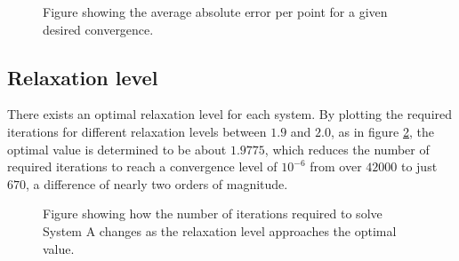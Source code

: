 \begin{figure}[h!]
\centering
\setlength\fboxsep{0pt}
\setlength\fboxrule{0.5pt}
\label{fig:convergence_accuracy}
\caption{Figure showing the average absolute error per point for a given desired convergence.}
\end{figure}

\subsection{Relaxation level}
There exists an optimal relaxation level for each system. By plotting the required iterations for different relaxation levels between $1.9$ and $2.0$, as in figure \ref{fig:relax_narrow}, the optimal value is determined to be about $1.9775$, which reduces the number of required iterations to reach a convergence level of $10^{-6}$ from over $42000$ to just $670$, a difference of nearly two orders of magnitude. 

\begin{figure}[h!]
\centering
\setlength\fboxsep{0pt}
\setlength\fboxrule{0.5pt}
\label{fig:relax_narrow}
\caption{Figure showing how the number of iterations required to solve System A changes as the relaxation level approaches the optimal value.}
\end{figure}

